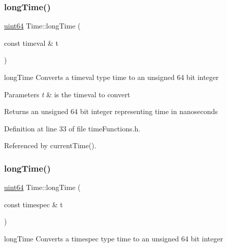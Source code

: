 \subsubsection{\texorpdfstring{long\+Time()}{longTime()}\hspace{0.1cm}{\footnotesize\ttfamily [1/2]}}
{\footnotesize\ttfamily \hyperlink{systemDefines_8h_abc0f5bc07737e498f287334775dff2b6}{uint64} Time\+::long\+Time (\begin{DoxyParamCaption}\item[{const timeval \&}]{t }\end{DoxyParamCaption})\hspace{0.3cm}{\ttfamily [inline]}}



long\+Time Converts a timeval type time to an unsigned 64 bit integer 


\begin{DoxyParams}{Parameters}
{\em t} & is the timeval to convert \\
\hline
\end{DoxyParams}
\begin{DoxyReturn}{Returns}
an unsigned 64 bit integer representing time in nanoseconds 
\end{DoxyReturn}


Definition at line 33 of file time\+Functions.\+h.



Referenced by current\+Time().

\mbox{\label{namespaceTime_a17419cc5dad406abf846351b1a75bd48}} 
\subsubsection{\texorpdfstring{long\+Time()}{longTime()}\hspace{0.1cm}{\footnotesize\ttfamily [2/2]}}
{\footnotesize\ttfamily \hyperlink{systemDefines_8h_abc0f5bc07737e498f287334775dff2b6}{uint64} Time\+::long\+Time (\begin{DoxyParamCaption}\item[{const timespec \&}]{t }\end{DoxyParamCaption})\hspace{0.3cm}{\ttfamily [inline]}}



long\+Time Converts a timespec type time to an unsigned 64 bit integer 


